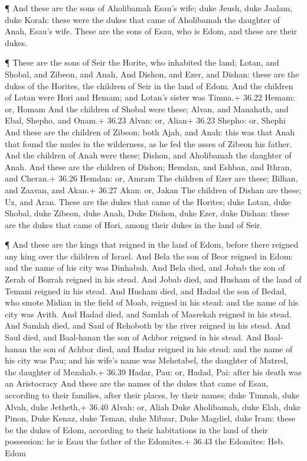  ¶ And these are the sons of Aholibamah Esau's wife; duke
Jeush, duke Jaalam, duke Korah: these were the dukes that came of
Aholibamah the daughter of Anah, Esau's wife.  These are
the sons of Esau, who is Edom, and these are their dukes.

 ¶ These are the sons of Seir the Horite, who inhabited the
land; Lotan, and Shobal, and Zibeon, and Anah,  And Dishon,
and Ezer, and Dishan: these are the dukes of the Horites, the children
of Seir in the land of Edom.  And the children of Lotan
were Hori and Hemam; and Lotan's sister was Timna.+ 36.22 Hemam: or,
Homam  And the children of Shobal were these; Alvan, and
Manahath, and Ebal, Shepho, and Onam.+ 36.23 Alvan: or, Alian+ 36.23
Shepho: or, Shephi  And these are the children of Zibeon;
both Ajah, and Anah: this was that Anah that found the mules in the
wilderness, as he fed the asses of Zibeon his father.  And
the children of Anah were these; Dishon, and Aholibamah the daughter of
Anah.  And these are the children of Dishon; Hemdan, and
Eshban, and Ithran, and Cheran.+ 36.26 Hemdan: or, Amram 
The children of Ezer are these; Bilhan, and Zaavan, and Akan.+ 36.27
Akan: or, Jakan  The children of Dishan are these; Uz, and
Aran.  These are the dukes that came of the Horites; duke
Lotan, duke Shobal, duke Zibeon, duke Anah,  Duke Dishon,
duke Ezer, duke Dishan: these are the dukes that came of Hori, among
their dukes in the land of Seir.

 ¶ And these are the kings that reigned in the land of
Edom, before there reigned any king over the children of Israel.
 And Bela the son of Beor reigned in Edom: and the name of
his city was Dinhabah.  And Bela died, and Jobab the son of
Zerah of Bozrah reigned in his stead.  And Jobab died, and
Husham of the land of Temani reigned in his stead.  And
Husham died, and Hadad the son of Bedad, who smote Midian in the field
of Moab, reigned in his stead: and the name of his city was Avith.
 And Hadad died, and Samlah of Masrekah reigned in his
stead.  And Samlah died, and Saul of Rehoboth by the river
reigned in his stead.  And Saul died, and Baal-hanan the
son of Achbor reigned in his stead.  And Baal-hanan the son
of Achbor died, and Hadar reigned in his stead: and the name of his city
was Pau; and his wife's name was Mehetabel, the daughter of Matred, the
daughter of Mezahab.+ 36.39 Hadar, Pau: or, Hadad, Pai: after his death
was an Aristocracy  And these are the names of the dukes
that came of Esau, according to their families, after their places, by
their names; duke Timnah, duke Alvah, duke Jetheth,+ 36.40 Alvah: or,
Aliah  Duke Aholibamah, duke Elah, duke Pinon,
 Duke Kenaz, duke Teman, duke Mibzar,  Duke
Magdiel, duke Iram: these be the dukes of Edom, according to their
habitations in the land of their possession: he is Esau the father of
the Edomites.+ 36.43 the Edomites: Heb. Edom

